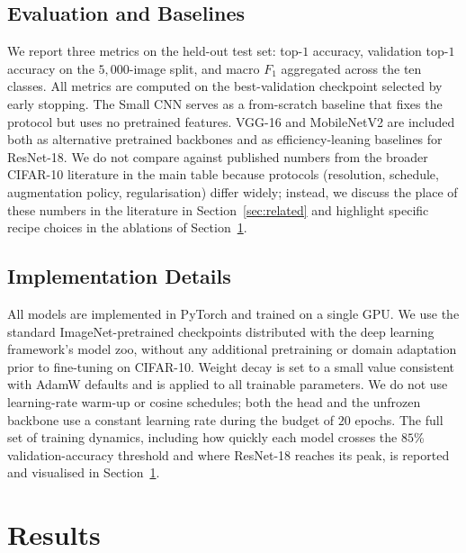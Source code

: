 \documentclass[10pt,twocolumn]{article}
\begin{document}
\subsection{Evaluation and Baselines}
\label{sec:exp:eval}

We report three metrics on the held-out test set: top-$1$ accuracy, validation top-$1$ accuracy on the $5{,}000$-image split, and macro $F_1$ aggregated across the ten classes. All metrics are computed on the best-validation checkpoint selected by early stopping. The Small CNN serves as a from-scratch baseline that fixes the protocol but uses no pretrained features. VGG-16 and MobileNetV2 are included both as alternative pretrained backbones and as efficiency-leaning baselines for ResNet-18. We do not compare against published numbers from the broader CIFAR-10 literature in the main table because protocols (resolution, schedule, augmentation policy, regularisation) differ widely; instead, we discuss the place of these numbers in the literature in Section~\ref{sec:related} and highlight specific recipe choices in the ablations of Section~\ref{sec:results}.

\subsection{Implementation Details}
\label{sec:exp:impl}

All models are implemented in PyTorch and trained on a single GPU. We use the standard ImageNet-pretrained checkpoints distributed with the deep learning framework's model zoo, without any additional pretraining or domain adaptation prior to fine-tuning on CIFAR-10. Weight decay is set to a small value consistent with AdamW defaults and is applied to all trainable parameters. We do not use learning-rate warm-up or cosine schedules; both the head and the unfrozen backbone use a constant learning rate during the budget of $20$ epochs. The full set of training dynamics, including how quickly each model crosses the $85$\% validation-accuracy threshold and where ResNet-18 reaches its peak, is reported and visualised in Section~\ref{sec:results}.


\section{Results}
\label{sec:results}
\end{document}
